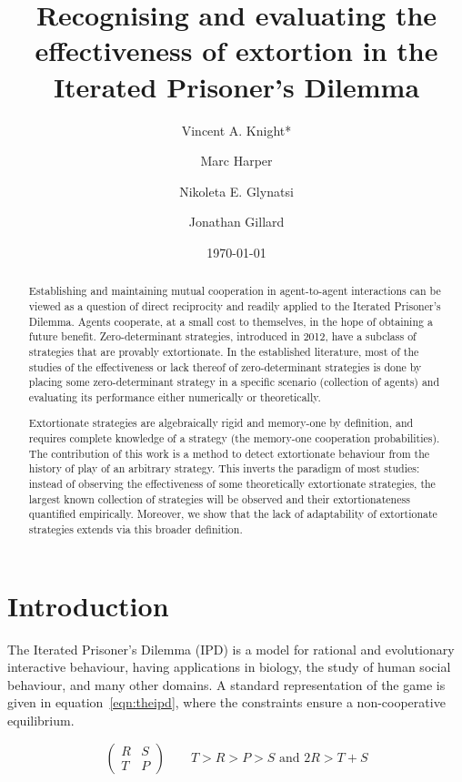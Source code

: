 \documentclass[a4paper]{article}
\title{Recognising and evaluating the effectiveness
       of extortion in the Iterated Prisoner's Dilemma}
\author[1]{Vincent A. Knight*}
\author[2]{Marc Harper}
\author[1]{Nikoleta E. Glynatsi}
\author[1]{Jonathan Gillard}
\affil[1]{Cardiff University, School of Mathematics, Cardiff, United Kingdom}
\affil[2]{Google Inc., Mountain View, CA, United States of America}
\date{\today}
\begin{document}
\maketitle

\begin{abstract}

Establishing and maintaining mutual cooperation in agent-to-agent interactions
can be viewed as a question of direct reciprocity and
readily applied to the Iterated Prisoner's Dilemma. Agents cooperate, at a
small cost to themselves, in the hope of obtaining a future benefit.
Zero-determinant strategies, introduced in 2012, have a subclass of
strategies that are provably extortionate. In the established literature,
most of the studies of the effectiveness or lack
thereof of zero-determinant strategies is done by placing some
zero-determinant strategy in a specific scenario (collection of agents) and
evaluating its performance either numerically or theoretically.

Extortionate strategies are algebraically rigid and memory-one by definition,
and requires complete knowledge of a strategy (the memory-one cooperation
probabilities). The contribution of this work is a method to detect
extortionate behaviour from the history of play of an arbitrary strategy. This inverts
the paradigm of most studies: instead of observing the effectiveness of some
theoretically extortionate strategies, the largest known collection of
strategies will be observed and their extortionateness quantified empirically.
Moreover, we show that the lack of adaptability of extortionate strategies
extends via this broader definition.
\end{abstract}

\section{Introduction}

The Iterated Prisoner's Dilemma (IPD) is a model for rational and evolutionary
interactive behaviour, having applications in biology, the study of human social
behaviour, and many other domains. A standard representation  of the game is
given in equation~\ref{eqn:theipd}, where the constraints ensure a
non-cooperative equilibrium.

\begin{equation}
    \begin{pmatrix}
        R & S \\
        T & P
    \end{pmatrix}
    \qquad
    T > R > P > S\text{ and }2 R > T + S
    \label{eqn:theipd}
\end{equation}
\end{document}
